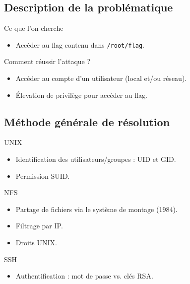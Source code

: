 \documentclass{beamer}
\begin{document}
        \subsection{Description de la problématique}

        \begin{frame}[fragile]
            \begin{block}{Ce que l'on cherche}
                \begin{itemize}
                    \item Accéder au flag contenu dans \verb+/root/flag+.
                \end{itemize}
            \end{block}
            \begin{block}{Comment réussir l'attaque ?}
                \begin{itemize}
                    \item Accéder au compte d'un utilisateur (local et/ou réseau).
                    \item Élevation de privilège pour accéder au flag.
                \end{itemize}
            \end{block}
        \end{frame}

        \subsection{Méthode générale de résolution}

        \begin{frame}[t]
            \begin{block}{UNIX}
                \begin{itemize}
                    \item Identification des utilisateurs/groupes : UID et GID.
                    \item Permission SUID.
                \end{itemize}
            \end{block}
            \begin{block}{NFS}
                \begin{itemize}
                    \item Partage de fichiers via le système de montage (1984).
                    \item Filtrage par IP.
                    \item Droits UNIX.
                \end{itemize}
            \end{block}
            \begin{block}{SSH}
                \begin{itemize}
                    \item Authentification : mot de passe vs. clés RSA.
                \end{itemize}
            \end{block}
        \end{frame}
\end{document}
